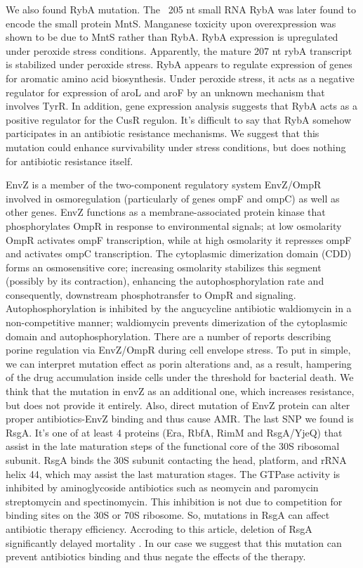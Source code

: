 \documentclass{article}
\begin{document}
We also found RybA mutation.
The ~205 nt small RNA RybA was later found to encode the small protein MntS. Manganese toxicity upon overexpression was shown to be due to MntS rather than RybA.
RybA expression is upregulated under peroxide stress conditions. Apparently, the mature 207 nt rybA transcript is stabilized under peroxide stress.
RybA appears to regulate expression of genes for aromatic amino acid biosynthesis. Under peroxide stress, it acts as a negative regulator for expression of aroL and aroF by an unknown mechanism that involves TyrR. In addition, gene expression analysis suggests that RybA acts as a positive regulator for the CusR regulon. It's difficult to say that RybA somehow participates in an antibiotic resistance mechanisms. We suggest that this mutation could enhance survivability under stress conditions, but does nothing for antibiotic resistance itself.

EnvZ is a member of the two-component regulatory system EnvZ/OmpR involved in osmoregulation (particularly of genes ompF and ompC) as well as other genes. EnvZ functions as a membrane-associated protein kinase that phosphorylates OmpR in response to environmental signals; at low osmolarity OmpR activates ompF transcription, while at high osmolarity it represses ompF and activates ompC transcription. The cytoplasmic dimerization domain (CDD) forms an osmosensitive core; increasing osmolarity stabilizes this segment (possibly by its contraction), enhancing the autophosphorylation rate and consequently, downstream phosphotransfer to OmpR and signaling. Autophosphorylation is inhibited by the angucycline antibiotic waldiomycin in a non-competitive manner; waldiomycin prevents dimerization of the cytoplasmic domain and autophosphorylation. There are a number of reports describing porine regulation via EnvZ/OmpR during cell envelope stress. To put in simple, we can interpret mutation effect as porin alterations and, as a result, hampering of the drug accumulation inside cells under the threshold for bacterial death. We think that the mutation in envZ as an additional one, which increases resistance, but does not provide it entirely. Also, direct mutation of EnvZ protein can alter proper antibiotics-EnvZ binding and thus cause AMR.
The last SNP we found is RsgA. It's one of at least 4 proteins (Era, RbfA, RimM and RsgA/YjeQ) that assist in the late maturation steps of the functional core of the 30S ribosomal subunit. RsgA binds the 30S subunit contacting the head, platform, and rRNA helix 44, which may assist the last maturation stages. The GTPase activity is inhibited by aminoglycoside antibiotics such as neomycin and paromycin streptomycin and spectinomycin. This inhibition is not due to competition for binding sites on the 30S or 70S ribosome. So, mutations in RsgA can affect antibiotic therapy efficiency. Accroding to this article, deletion of RsgA significantly delayed mortality \cite{pubmed}. In our case we suggest that this mutation can prevent antibiotics binding and thus negate the effects of the therapy.
\end{document}
